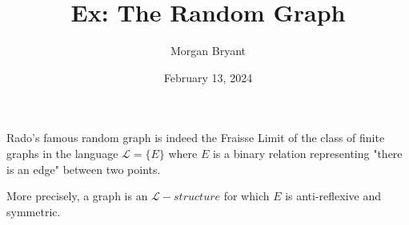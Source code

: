 \documentclass[a4paper]{article}
\title{Ex: The Random Graph}
\date{February 13, 2024}
\author{Morgan Bryant}
\begin{document}
\maketitle
\par{Rado's famous random graph is indeed the Fraisse Limit of the class of finite graphs in the language \(\mathcal {L} =  \{ E \}\) where \(E\) is a binary relation representing "there is an edge" between two points.}\par{More precisely, a graph is an \(\mathcal {L}-structure\) for which \(E\) is anti-reflexive and symmetric.}
\printbibliography
\end{document}
